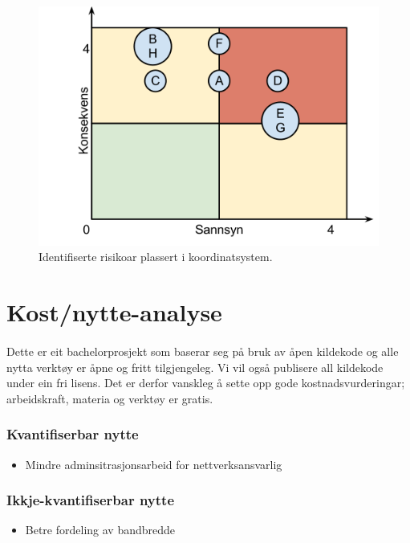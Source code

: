 \documentclass[nynorsk,12pt,a4paper]{article}
\begin{document}
\begin{figure}[h!]
	\centering
	\includegraphics[scale=0.75]{./vdok-img/vdok-ros.png}
	\caption{Identifiserte risikoar plassert i koordinatsystem.}
\end{figure}

\newpage
\section{Kost/nytte-analyse}
\paragraph{}
Dette er eit bachelorprosjekt som baserar seg på bruk av åpen kildekode og alle nytta verktøy er åpne og fritt tilgjengeleg. Vi vil også publisere all kildekode under ein fri lisens. Det er derfor vanskleg å sette opp gode kostnadsvurderingar; arbeidskraft, materia og verktøy er gratis. 

\subsubsection{Kvantifiserbar nytte}
\begin{itemize}
	\item Mindre adminsitrasjonsarbeid for nettverksansvarlig
\end{itemize}

\subsubsection{Ikkje-kvantifiserbar nytte}
\begin{itemize}
	\item Betre fordeling av bandbredde
\end{itemize}
\end{document}
